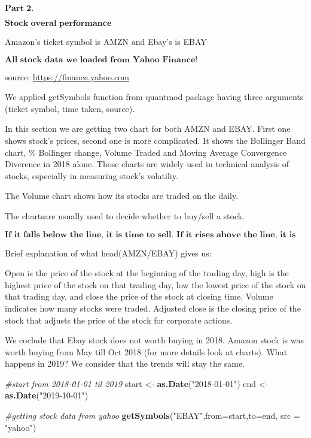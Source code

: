\documentclass[]{article}
\newenvironment{Shaded}{\begin{snugshade}}{\end{snugshade}}
\newcommand{\KeywordTok}[1]{\textcolor[rgb]{0.13,0.29,0.53}{\textbf{#1}}}
\newcommand{\DataTypeTok}[1]{\textcolor[rgb]{0.13,0.29,0.53}{#1}}
\newcommand{\StringTok}[1]{\textcolor[rgb]{0.31,0.60,0.02}{#1}}
\newcommand{\CommentTok}[1]{\textcolor[rgb]{0.56,0.35,0.01}{\textit{#1}}}
\newcommand{\NormalTok}[1]{#1}
\begin{document}
\(\textbf{Part 2.}\)

\(\textbf{Stock overal performance}\)

Amazon's ticket symbol is AMZN and Ebay's is EBAY

\(\textbf{All stock data we loaded from Yahoo Finance!}\)

source: \url{https://finance.yahoo.com}

We applied getSymbols function from quantmod package having three
arguments (ticket symbol, time taken, source).

In this section we are getting two chart for both AMZN and EBAY. First
one shows stock's prices, second one is more complicated. It shows the
Bollinger Band chart, \% Bollinger change, Volume Traded and Moving
Average Convergence Diverence in 2018 alone. Those charts are widely
used in technical analysis of stocks, especially in measuring stock's
volatiliy.

The Volume chart shows how its stocks are traded on the daily.

The chartsare usually used to decide whether to buy/sell a stock.

\(\textbf{If it falls below the line, it is time to sell. If it rises above the line, it is experiencing an upward momentum.}\)

Brief explanation of what head(AMZN/EBAY) gives us:\n

Open is the price of the stock at the beginning of the trading day, high
is the highest price of the stock on that trading day, low the lowest
price of the stock on that trading day, and close the price of the stock
at closing time. Volume indicates how many stocks were traded. Adjusted
close is the closing price of the stock that adjusts the price of the
stock for corporate actions.

We coclude that Ebay stock does not worth buying in 2018. Amazon stock
is was worth buying from May till Oct 2018 (for more details look at
charts). What happens in 2019? We consider that the trends will stay the
same.

\begin{Shaded}
\begin{Highlighting}[]
\CommentTok{#start from 2018-01-01 til 2019}
\NormalTok{start <-}\StringTok{ }\KeywordTok{as.Date}\NormalTok{(}\StringTok{"2018-01-01"}\NormalTok{)}
\NormalTok{end <-}\StringTok{ }\KeywordTok{as.Date}\NormalTok{(}\StringTok{"2019-10-01"}\NormalTok{)}

\CommentTok{#getting stock data from yahoo}
\KeywordTok{getSymbols}\NormalTok{(}\StringTok{"EBAY"}\NormalTok{,}\DataTypeTok{from=}\NormalTok{start,}\DataTypeTok{to=}\NormalTok{end, }\DataTypeTok{src =} \StringTok{"yahoo"}\NormalTok{)}
\end{Highlighting}
\end{Shaded}
\end{document}
